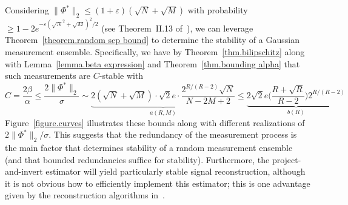 \documentclass[times,10pt]{elsarticle}
\theoremstyle{plain}
\begin{document}
Considering $\|\Phi^*\|_2\leq(1+\varepsilon)(\sqrt{N}+\sqrt{M})$ with probability $\geq1-2e^{-\varepsilon(\sqrt{N}^2+\sqrt{M})^2/2}$ (see Theorem~II.13 of~\cite{DavidsonS:01}), we can leverage Theorem~\ref{theorem.random scp bound} to determine the stability of a Gaussian measurement ensemble.
Specifically, we have by Theorem~\ref{thm.bilipschitz} along with Lemma~\ref{lemma.beta expression} and Theorem~\ref{thm.bounding alpha} that such measurements are $C$-stable with
\begin{equation}
\label{eq.bounds on random C}
C=\frac{2\beta}{\alpha}
\leq\frac{2\|\Phi^*\|_2}{\sigma}
\sim \underbrace{2(\sqrt{N}+\sqrt{M})\cdot\sqrt{2}e\cdot\frac{2^{R/(R-2)}\sqrt{N}}{N-2M+2}}_{a(R,M)}
\leq \underbrace{2\sqrt{2}e\bigg(\frac{R+\sqrt{R}}{R-2}\bigg)2^{R/(R-2)}}_{b(R)}
\end{equation}
Figure~\ref{figure.curves} illustrates these bounds along with different realizations of $2\|\Phi^*\|_2/\sigma$.
This suggests that the redundancy of the measurement process is the main factor that determines stability of a random measurement ensemble (and that bounded redundancies suffice for stability).
Furthermore, the project-and-invert estimator will yield particularly stable signal reconstruction, although it is not obvious how to efficiently implement this estimator; this is one advantage given by the reconstruction algorithms in~\cite{AlexeevBFM:12,CandesSV:11}.
\end{document}

